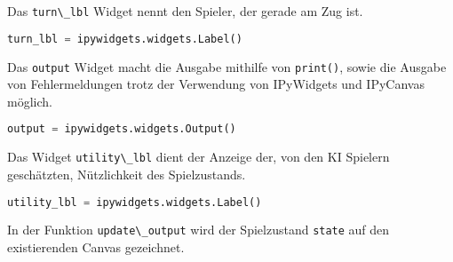 Das \passthrough{\lstinline!turn\_lbl!} Widget nennt den Spieler, der
gerade am Zug ist.

\begin{lstlisting}[language=Python]
turn_lbl = ipywidgets.widgets.Label()
\end{lstlisting}

Das \passthrough{\lstinline!output!} Widget macht die Ausgabe mithilfe
von \passthrough{\lstinline!print()!}, sowie die Ausgabe von
Fehlermeldungen trotz der Verwendung von IPyWidgets und IPyCanvas
möglich.

\begin{lstlisting}[language=Python]
output = ipywidgets.widgets.Output()
\end{lstlisting}

Das Widget \passthrough{\lstinline!utility\_lbl!} dient der Anzeige der,
von den \ac{KI} Spielern geschätzten, Nützlichkeit des Spielzustands.

\begin{lstlisting}[language=Python]
utility_lbl = ipywidgets.widgets.Label()
\end{lstlisting}

In der Funktion \passthrough{\lstinline!update\_output!} wird der
Spielzustand \passthrough{\lstinline!state!} auf den existierenden
Canvas gezeichnet.

